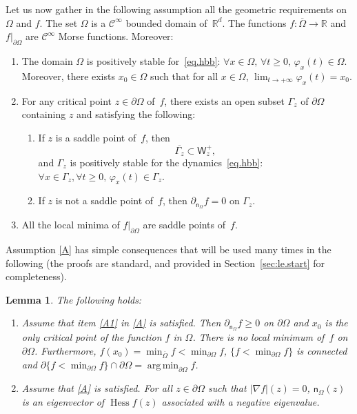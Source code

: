 \documentclass[10pt]{amsart}
\let\pa\partial
\DeclareMathOperator*{\argmin}{arg\,min}
\DeclareMathOperator{\hess}{Hess}\let\Hess\hess
\theoremstyle{plain}
\newtheorem{lemma}[proposition]{Lemma}
\theoremstyle{definition}
\newenvironment{manualassumption}[1]{%
\renewcommand\themanualassumptioninner{#1}%
\manualassumptioninner}{\endmanualassumptioninner}
\begin{document}
Let us now gather
in the following assumption all the geometric requirements on $\Omega$
and $f$.
\begin{manualassumption}{$(\Omega$-$f)$}\label{A}
The set $\Omega$ is a $\mathcal C^\infty$ bounded domain of~$\mathbb R^d$. The functions \hbox{$f:\overline \Omega\to \mathbb R$} and $f|_{\partial \Omega}$
are $\mathcal C^\infty$ Morse functions. Moreover:
\begin{enumerate}
\item\label{A1}
The domain $\Omega$ is positively stable for~\eqref{eq.hbb}:
$\forall x\in \Omega, \, \forall t\ge 0, \, \varphi_x(t)\in
\Omega$. Moreover, there exists $x_0\in \Omega$ such that for all $x\in \Omega$, $\lim_{t\to +\infty}\varphi_x(t)=x_0$.

\item\label{A2}
For any critical point $z\in \partial \Omega$ of~$f$, there exists an open
subset $\Gamma_z$ of $\partial
\Omega$ containing $z$ and satisfying the following:
\begin{enumerate}
\item\label{A2a}
If $z$ is a saddle point of~$f$, then
\begin{equation}\label{eq.incluWW}
\overline{\Gamma_{z} }\subset \mathsf W_z^+,
\end{equation}
and $\Gamma_z$ is positively stable for the
dynamics~\eqref{eq.hbb}: $\forall x\in \Gamma_{z}, \forall t\ge 0,
\, \varphi_x(t)\in \Gamma_{z}$.

\item\label{A2b}
If $z$ is not a saddle point of~$f$, then $\partial_{\mathsf n_\Omega} f=0$ on $\Gamma_z$.
\end{enumerate}

\item\label{A3}
All the local minima of $f|_{\partial \Omega}$ are saddle points of~$f$.
\end{enumerate}
\end{manualassumption}

Assumption \ref{A} has simple consequences that will be used
many times in the following (the proofs are standard, and provided in
Section~\ref{sec:le.start} for completeness).

\begin{lemma}\label{le.start}
The following holds:
\begin{enumerate}
\item\label{le.start1}
Assume that item \eqref{A1} in \ref{A} is satisfied. Then $\partial_{\mathsf n_\Omega}f\ge 0$ on $\partial \Omega$ and $x_0$ is the only critical point of the function $f$ in $\Omega$. There is no local minimum of~$f$ on $\partial \Omega$. Furthermore,
$f(x_0)=\min_{\overline \Omega}f<\min_{\partial \Omega}f$, $\{f< \min_{\partial \Omega}f\}$ is connected and $\pa \{f< \min_{\partial \Omega}f\}\cap \partial \Omega =\argmin_{\partial \Omega}f$.

\item\label{le.start2}
Assume that \ref{A} is satisfied. For all $z\in \partial \Omega$ such that $\vert \nabla f\vert (z)=0$, $\mathsf n_\Omega(z)$ is an eigenvector of $\hess f(z)$ associated with a negative eigenvalue.
\end{enumerate}
\end{lemma}
\end{document}
